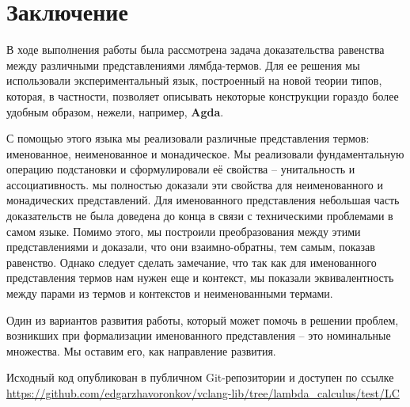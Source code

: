 \section*{Заключение}

В ходе выполнения работы была рассмотрена задача доказательства равенства между различными представлениями лямбда-термов. Для ее решения мы использовали экспериментальный язык, построенный на новой теории типов, которая, в частности, позволяет описывать некоторые конструкции гораздо более удобным образом, нежели, например, \textbf{Agda}.

С помощью этого языка мы реализовали различные представления термов: именованное, неименованное и монадическое. Мы реализовали фундаментальную операцию подстановки и сформулировали её свойства -- унитальность и ассоциативность. мы полностью доказали эти свойства для неименованного и монадических представлений. Для именованного представления небольшая часть доказательств не была доведена до конца в связи с техническими проблемами в самом языке. Помимо этого, мы построили преобразования между этими представлениями и доказали, что они взаимно-обратны, тем самым, показав равенство. Однако следует сделать замечание, что так как для именованного представления термов нам нужен еще и контекст, мы показали эквивалентность между парами из термов и контекстов и неименованными термами.

Один из вариантов развития работы, который может помочь в решении проблем, возникших при формализации именованного представления -- это номинальные множества. Мы оставим его, как направление развития.

Исходный код опубликован в публичном Git-репозитории и доступен по ссылке \url{https://github.com/edgarzhavoronkov/vclang-lib/tree/lambda_calculus/test/LC}

